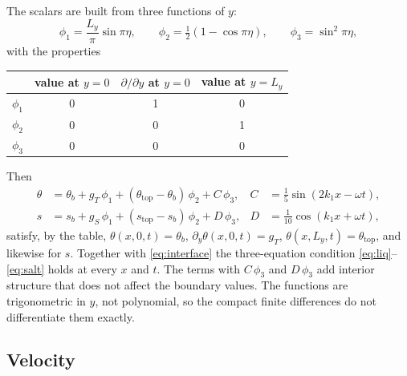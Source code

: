\documentclass[11pt,a4paper]{article}
\begin{document}
The scalars are built from three functions of $y$:
\begin{equation}
  \phi_1 = \frac{L_y}{\pi}\sin\pi\eta, \qquad
  \phi_2 = \tfrac12\left(1-\cos\pi\eta\right), \qquad
  \phi_3 = \sin^2\pi\eta ,
\end{equation}
with the properties
\begin{center}
\begin{tabular}{lccc}
\toprule
 & value at $y=0$ & $\partial/\partial y$ at $y=0$ & value at $y=L_y$ \\
\midrule
$\phi_1$ & 0 & 1 & 0 \\
$\phi_2$ & 0 & 0 & 1 \\
$\phi_3$ & 0 & 0 & 0 \\
\bottomrule
\end{tabular}
\end{center}
Then
\begin{align}
  \theta &= \theta_b + g_T\,\phi_1 + (\theta_{\mathrm{top}}-\theta_b)\,\phi_2 + C\,\phi_3,
     & C &= \tfrac15\sin(2k_1x-\omega t), \label{eq:thex}\\
  s      &= s_b + g_S\,\phi_1 + (s_{\mathrm{top}}-s_b)\,\phi_2 + D\,\phi_3,
     & D &= \tfrac1{10}\cos(k_1x+\omega t), \label{eq:sex}
\end{align}
satisfy, by the table, $\theta(x,0,t)=\theta_b$, $\partial_y\theta(x,0,t)=g_T$,
$\theta(x,L_y,t)=\theta_{\mathrm{top}}$, and likewise for $s$. Together with \eqref{eq:interface} the
three-equation condition \eqref{eq:liq}--\eqref{eq:salt} holds at every $x$ and $t$. The terms with
$C\,\phi_3$ and $D\,\phi_3$ add interior structure that does not affect the boundary values. The functions
are trigonometric in $y$, not polynomial, so the compact finite differences do not differentiate them
exactly.

\subsection{Velocity}
\end{document}

